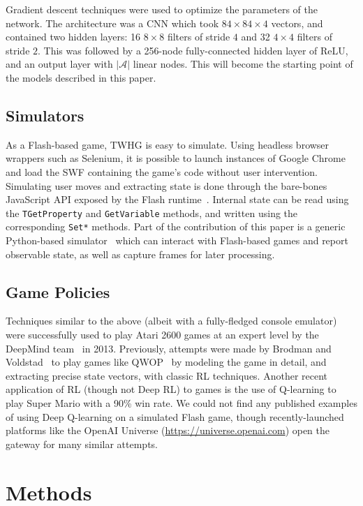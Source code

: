 \documentclass[9pt,journal]{IEEEtran}
\begin{document}
Gradient descent techniques were used to optimize the parameters of the network. The architecture was a CNN which took $84 \times 84 \times 4$ vectors, and contained two hidden layers: 16 $8 \times 8$ filters of stride $4$ and 32 $4 \times 4$ filters of stride $2$. This was followed by a 256-node fully-connected hidden layer of ReLU, and an output layer with $|\mathcal{A}|$ linear nodes. This will become the starting point of the models described in this paper.

\subsection{Simulators}

As a Flash-based game, TWHG is easy to simulate. Using headless browser wrappers such as Selenium, it is possible to launch instances of Google Chrome and load the SWF containing the game's code without user intervention. Simulating user moves and extracting state is done through the bare-bones JavaScript API exposed by the Flash runtime~\cite{flashjs}. Internal state can be read using the \texttt{TGetProperty} and \texttt{GetVariable} methods, and written using the corresponding \texttt{Set*} methods. Part of the contribution of this paper is a generic Python-based simulator~\cite{simulator} which can interact with Flash-based games and report observable state, as well as capture frames for later processing.

\subsection{Game Policies}

Techniques similar to the above (albeit with a fully-fledged console emulator) were successfully used to play Atari 2600 games at an expert level by the DeepMind team~\cite{deepmind} in 2013. Previously, attempts were made by Brodman and Voldstad~\cite{Brodman2012QwopL} to play games like QWOP~\cite{qwop} by modeling the game in detail, and extracting precise state vectors, with classic RL techniques. Another recent application of RL (though not Deep RL) to games is the use of Q-learning to play Super Mario with a 90\% win rate\cite{Liao2012Cs229FR}. We could not find any published examples of using Deep Q-learning on a simulated Flash game, though recently-launched platforms like the OpenAI Universe (\url{https://universe.openai.com}) open the gateway for many similar attempts.

\section{Methods}
\end{document}
